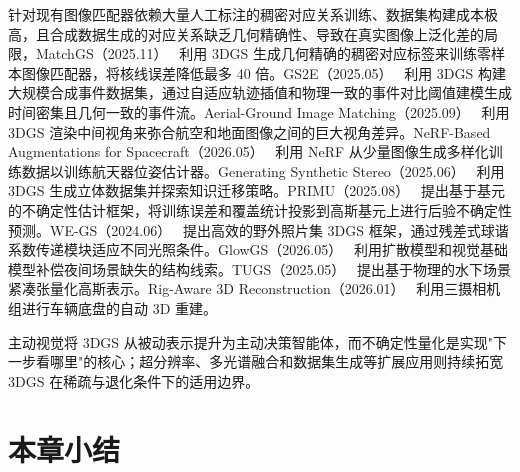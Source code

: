 针对现有图像匹配器依赖大量人工标注的稠密对应关系训练、数据集构建成本极高，且合成数据生成的对应关系缺乏几何精确性、导致在真实图像上泛化差的局限，MatchGS（2025.11）~\cite{2511_21265} 利用 3DGS 生成几何精确的稠密对应标签来训练零样本图像匹配器，将核线误差降低最多 40 倍。GS2E（2025.05）~\cite{2505_15287} 利用 3DGS 构建大规模合成事件数据集，通过自适应轨迹插值和物理一致的事件对比阈值建模生成时间密集且几何一致的事件流。Aerial-Ground Image Matching（2025.09）~\cite{2509_19898} 利用 3DGS 渲染中间视角来弥合航空和地面图像之间的巨大视角差异。NeRF-Based Augmentations for Spacecraft（2026.05）~\cite{2605_19649} 利用 NeRF 从少量图像生成多样化训练数据以训练航天器位姿估计器。Generating Synthetic Stereo（2025.06）~\cite{2506_04908} 利用 3DGS 生成立体数据集并探索知识迁移策略。PRIMU（2025.08）~\cite{2508_02443} 提出基于基元的不确定性估计框架，将训练误差和覆盖统计投影到高斯基元上进行后验不确定性预测。WE-GS（2024.06）~\cite{2406_02407} 提出高效的野外照片集 3DGS 框架，通过残差式球谐系数传递模块适应不同光照条件。GlowGS（2026.05）~\cite{2605_23602} 利用扩散模型和视觉基础模型补偿夜间场景缺失的结构线索。TUGS（2025.05）~\cite{2505_08811} 提出基于物理的水下场景紧凑张量化高斯表示。Rig-Aware 3D Reconstruction（2026.01）~\cite{2601_14208} 利用三摄相机组进行车辆底盘的自动 3D 重建。

\begin{takeaway}
主动视觉将 3DGS 从被动表示提升为主动决策智能体，而不确定性量化是实现"下一步看哪里"的核心；超分辨率、多光谱融合和数据集生成等扩展应用则持续拓宽 3DGS 在稀疏与退化条件下的适用边界。
\end{takeaway}




\section*{本章小结}

